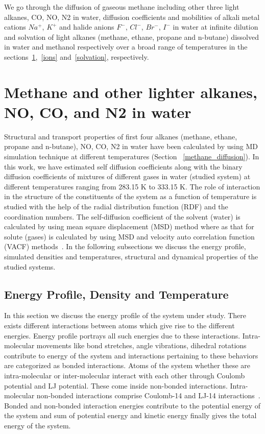 We go through the diffusion of  gaseous methane including other three light alkanes, CO, NO, N2 in water,  diffusion coefficients  and mobilities of alkali metal cations $Na^{+}$, $K^{+}$ and halide anions $F^{-}$, $Cl^{-}$, $Br^{-}$, $I^{-}$ in water at infinite dilution and  solvation of    light alkanes (methane, ethane, propane and n-butane) dissolved in water and methanol  respectively over a broad range of temperatures in the sections~\ref{methanegas},~\ref{ions} and~\ref{solvation}, respectively.
\section{Methane and other lighter alkanes, NO, CO, and N2 in water} \label{methanegas}
Structural and transport properties of first four alkanes (methane, ethane, propane and n-butane), NO, CO, N2 in water have been calculated by using MD simulation technique at different temperatures (Section ~\ref{methane_diffusion}). In this work, we have estimated self diffusion coefficients along with the binary diffusion coefficients of mixtures of different gases in water  (studied system)  at different temperatures ranging from 283.15 K to 333.15 K. The role of interaction in the structure of the constituents of the system  as a function of temperature is studied with the help of the radial distribution function (RDF) and the coordination numbers. The self-diffusion coefficient of the solvent (water) is calculated by using mean square displacement (MSD) method  where as that for solute (gases)  is calculated by using MSD  and velocity auto correlation function (VACF) methods~\citep{Allen1989, Frenkel2002}. In the following subsections we discuss the energy profile, simulated densities and temperatures,  structural  and dynamical properties of the studied systems.
   
\subsection{Energy Profile, Density and Temperature}
In this section we discuss the energy profile of the system under study. There exists different interactions between atoms which give rise to the different energies. Energy profile portrays all such energies due to these interactions. Intra-molecular movements like bond stretches, angle vibrations, dihedral rotations contribute to energy of the system and interactions pertaining to these behaviors are
categorized as bonded interactions. Atoms of the system whether these are intra-molecular or inter-molecular interact with each other through Coulomb potential and LJ potential. These come inside non-bonded interactions. Intra-molecular non-bonded interactions comprise Coulomb-14 and LJ-14 interactions~\citep{Allen1989, Gromacs-manual}. Bonded and non-bonded interaction energies contribute to the potential energy of the system and sum of potential energy and kinetic energy finally gives the total energy of the system.

